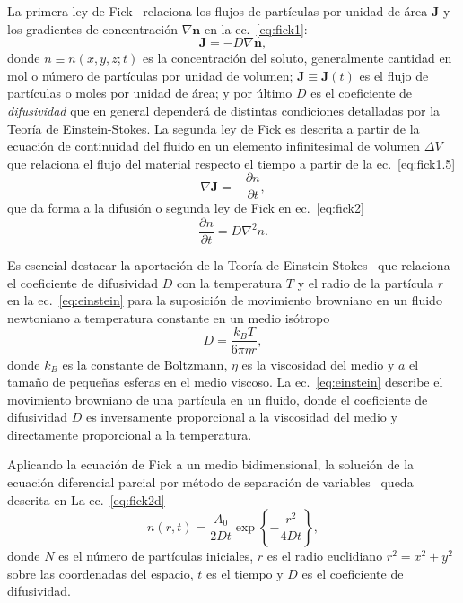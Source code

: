 \documentclass{article}[13pt]
\begin{document}
La primera ley de Fick~\cite{gilExperimentosFisicaUsando2014} relaciona los flujos de partículas por unidad de área $\mathbf{J}$ y los gradientes de concentración $\nabla \mathbf{n}$ en la ec.~\ref{eq:fick1}:
\begin{equation}
    \mathbf{J} = -D \nabla \mathbf{n},
    \label{eq:fick1}
\end{equation}
donde $n\equiv n(x,y,z;t)$ es la concentración del soluto, generalmente cantidad en mol o número de partículas por unidad de volumen; $\mathbf{J}\equiv\mathbf{J}(t)$ es el flujo de partículas o moles por unidad de área; y por último $D$ es el coeficiente de \textit{difusividad} que en general dependerá de distintas condiciones  detalladas por la Teoría de Einstein-Stokes.
La segunda ley de Fick es descrita a partir de la ecuación de continuidad del fluido en un elemento infinitesimal de volumen $\Delta V$ que relaciona el flujo del material respecto el tiempo a partir de la ec.~\ref{eq:fick1.5}
\begin{equation}
    \nabla \mathbf{J} = -\frac{\partial n}{\partial t},
    \label{eq:fick1.5}
\end{equation}
que da forma a la difusión o segunda ley de Fick en ec.~\ref{eq:fick2}
\begin{equation}
    \frac{\partial n}{\partial t} = D \nabla^2 n.
    \label{eq:fick2}
\end{equation}

Es esencial destacar la aportación de la Teoría de Einstein-Stokes~\cite{einsteinUberMolekularkinetischenTheorie1905} que relaciona el coeficiente de difusividad $D$ con la temperatura $T$ y el radio de la partícula $r$ en la ec.~\ref{eq:einstein} para la suposición de movimiento browniano en un fluido newtoniano a temperatura constante en un medio isótropo~\cite{leeInkDifussionWater2004}
\begin{equation}
    D = \frac{k_B T}{6 \pi \eta r},
    \label{eq:einstein}
\end{equation}
donde $k_B$ es la constante de Boltzmann, $\eta$ es la viscosidad del medio y $a$ el tamaño de pequeñas esferas en el medio viscoso. La ec.~\ref{eq:einstein} describe el movimiento browniano de una partícula en un fluido, donde el coeficiente de difusividad $D$ es inversamente proporcional a la viscosidad del medio y directamente proporcional a la temperatura.

Aplicando la ecuación de Fick a un medio bidimensional, la solución de la ecuación diferencial parcial por método de separación de variables~\cite{gilExperimentosFisicaUsando2014} queda descrita en La ec.~\ref{eq:fick2d}\
\begin{equation}
    n(r,t) = \frac{A_0}{2 D t} \exp{\left\{-\frac{r^2}{4Dt}\right\}},
    \label{eq:fick2d}
\end{equation}
donde $N$ es el número de partículas iniciales, $r$ es el radio euclidiano $r^2 = x^2 + y^2$ sobre las coordenadas del espacio, $t$ es el tiempo y $D$ es el coeficiente de difusividad. 
\end{document}
